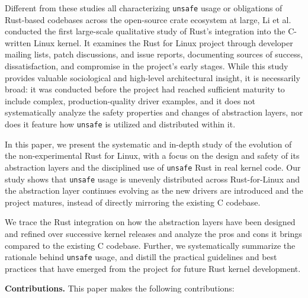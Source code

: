 \documentclass[conference]{IEEEtran}
\begin{document}
Different from these studies all characterizing \texttt{unsafe} usage or obligations of Rust-based codebases across the open-source crate ecosystem at large, Li et al.~\cite{TODO:li2024empirical} conducted the first large-scale qualitative study of Rust's integration into the C-written Linux kernel.
It examines the Rust for Linux project through developer mailing lists, patch discussions, and issue reports, documenting sources of success, dissatisfaction, and compromise in the project's early stages.
While this study provides valuable sociological and high-level architectural insight, it is necessarily broad: it was conducted before the project had reached sufficient maturity to include complex, production-quality driver examples, and it does not systematically analyze the safety properties and  changes of abstraction layers, nor does it feature how \texttt{unsafe} is utilized and distributed within it.

In this paper, we present the systematic and in-depth study of the evolution of the non-experimental Rust for Linux, with a focus on the design and safety of its abstraction layers and the disciplined use of \texttt{unsafe} Rust in real kernel code. Our study shows that \texttt{unsafe} usage is unevenly distributed across Rust-for-Linux and the abstraction layer continues evolving as the new drivers are introduced and the project matures, instead of directly mirroring the existing C codebase.

We trace the Rust integration on how the abstraction layers have been designed and refined over successive kernel releases and analyze the pros and cons it brings compared to the existing C codebase. 
Further, we systematically summarize the rationale behind \texttt{unsafe} usage, and distill the practical guidelines and best practices that have emerged from the project for future Rust kernel development.

\medskip
\noindent\textbf{Contributions.} This paper makes the following contributions:
\end{document}
